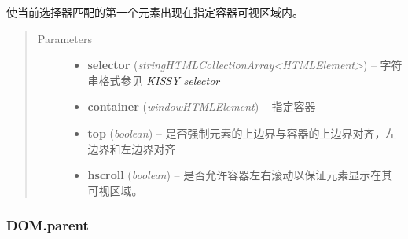 \documentclass[letterpaper,10pt,english]{sphinxmanual}
\begin{document}
\begin{fulllineitems}
\label{api/core/dom/scrollIntoView:DOM.scrollIntoView}
使当前选择器匹配的第一个元素出现在指定容器可视区域内。
\begin{quote}\begin{description}
\item[{Parameters}] \leavevmode\begin{itemize}
\item {}
\textbf{selector} (\emph{string\textbar{}HTMLCollection\textbar{}Array\textless{}HTMLElement\textgreater{}}) -- 字符串格式参见 {\hyperref[api/core/dom/selector:dom-selector]{\emph{KISSY selector}}}

\item {}
\textbf{container} (\emph{window\textbar{}HTMLElement}) -- 指定容器

\item {}
\textbf{top} (\emph{boolean}) -- 是否强制元素的上边界与容器的上边界对齐，左边界和左边界对齐

\item {}
\textbf{hscroll} (\emph{boolean}) -- 是否允许容器左右滚动以保证元素显示在其可视区域。

\end{itemize}

\end{description}\end{quote}

\end{fulllineitems}



\subsubsection{DOM.parent}
\label{api/core/dom/parent:dom-parent}\label{api/core/dom/parent::doc}
\end{document}
